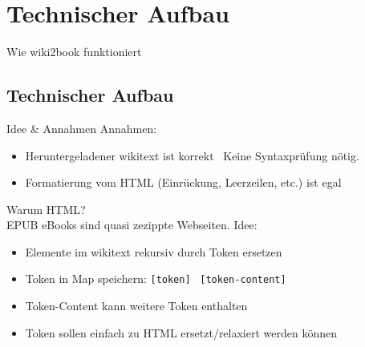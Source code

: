 \documentclass[9pt]{beamer}
\begin{document}
	\section{Technischer Aufbau}
	
	\begin{frame}
		\vspace{1cm}
		\begin{center}
			Wie wiki2book funktioniert
		\end{center}
	\end{frame}
	
	\subsection{Technischer Aufbau}
	
	\begin{frame}{Idee \& Annahmen}
		Annahmen:
		\begin{itemize}
			\item Heruntergeladener wikitext ist korrekt \textrightarrow\ Keine Syntaxprüfung nötig.
			\item Formatierung vom HTML (Einrückung, Leerzeilen, etc.) ist egal
		\end{itemize}\pause
		\vspace{0.25cm}
		Warum HTML?\\
		EPUB eBooks sind quasi zezippte Webseiten.\pause\n
		Idee:
		\begin{itemize}
			\item Elemente im wikitext rekursiv durch Token ersetzen
			\item Token in Map speichern: \texttt{[token]} \textrightarrow\ \texttt{[token-content]}
			\item Token-Content kann weitere Token enthalten
			\item Token sollen einfach zu HTML ersetzt/relaxiert werden können
		\end{itemize}
	\end{frame}
	
\end{document}
